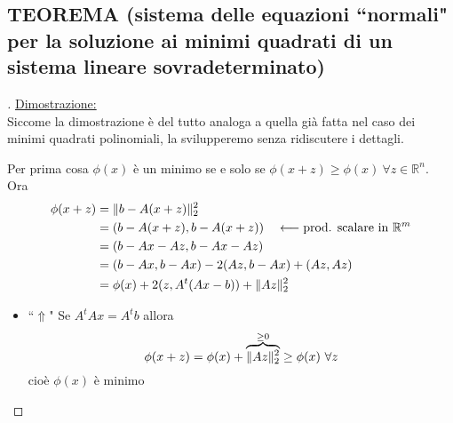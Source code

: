 \documentclass[12pt,a4paper]{article}
\DeclarePairedDelimiter{\norma}{\lVert}{\rVert}
\begin{document}
\subsection{TEOREMA (sistema delle equazioni ``normali" per la soluzione ai minimi quadrati di un sistema lineare sovradeterminato)} 
\begin{center}
\end{center}
\begin{proof}[\unskip\nopunct]
\uline{Dimostrazione:}\\
Siccome la dimostrazione è del tutto analoga a quella già fatta nel caso dei minimi quadrati polinomiali, la svilupperemo senza ridiscutere i dettagli. 

Per prima cosa $\phi(x)$ è un minimo se e solo se $\phi(x+z)\geq \phi(x) \ \forall z \in \mathbb{R}^n$. \\
Ora
\begin{equation*}
    \begin{split}
        \phi(x+z) & = \norma{b-A(x+z)}_2^2 \\
        & = (b-A(x+z), b-A(x+z)) \quad \longleftarrow \text{prod. scalare in } \mathbb{R}^m\\
        & = (b-Ax-Az, b-Ax-Az) \\
        & = (b-Ax, b-Ax)-2(Az,b-Ax) + (Az, Az) \\
        & = \phi(x) + 2(z,A^t(Ax-b))+\norma{Az}_2^2
    \end{split}
\end{equation*}
\begin{itemize}
\item``$\Uparrow$" Se $A^tAx=A^tb$ allora 
\begin{equation*}
    \phi(x+z) = \phi(x) + \overbrace{\norma{Az}_2^2}^{\geq 0} \geq \phi(x) \ \forall z
\end{equation*}
cioè $\phi(x)$ è minimo


\end{itemize}
\end{proof}
\end{document}
